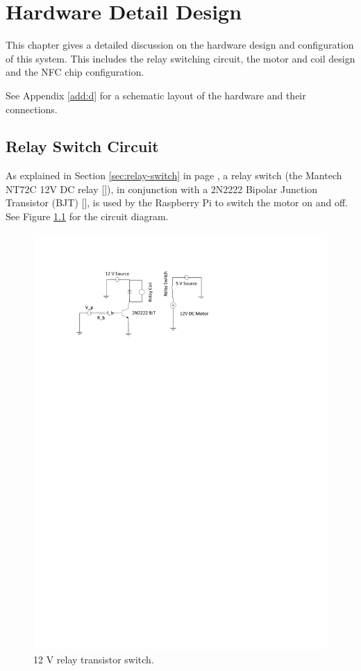 \chapter{Hardware Detail Design}
\label{chap:5}

This chapter gives a detailed discussion on the hardware design and
configuration of this system. This includes the relay switching circuit, the
motor and coil design and the NFC chip configuration.

See Appendix \ref{add:d} for a schematic layout of the hardware and their
connections.

\section{Relay Switch Circuit}
\label{sec:detail-switch}

As explained in Section \ref{sec:relay-switch} in page \pageref{sec:relay-switch}, a relay
switch (the Mantech NT72C 12V DC relay [\cite{manual:relay-specs}]), in conjunction with a 2N2222
Bipolar Junction Transistor (BJT) [\cite{maunual:transistor-datasheet}], is used
by the Raspberry Pi to switch the motor on and off. See Figure
\ref{fig:relay-switch} for the circuit diagram.

\begin{figure}
\centering
\includegraphics[clip = true, trim = 0 640 0 70, scale=1]{relay_switch}
\caption{12 V relay transistor switch.}
\label{fig:relay-switch}
\end{figure}

